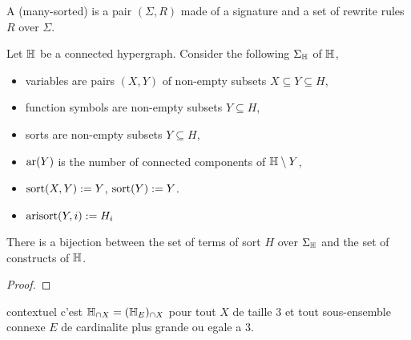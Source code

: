 \begin{definition}
  A (many-sorted)  is a pair $(\Sigma,R)$ made of a signature and a set of rewrite rules $R$ over $\Sigma$.
\end{definition}

Let ${\mathbb H}$ be a connected hypergraph. 
Consider the following  $\Sigma_{\mathbb H}$ of ${\mathbb H}$,  
\begin{itemize}
  \item variables are pairs $(X,Y)$ of non-empty subsets $X \subseteq Y \subseteq H$,
  \item function symbols are non-empty subsets $Y \subseteq H$,
  \item sorts are non-empty subsets $Y \subseteq H$,
  \item $\mathrm{ar}(Y)$ is the number of connected components of ${\mathbb H}\setminus Y$,
  \item $\operatorname{sort}(X,Y):=Y$, $\operatorname{sort}(Y):=Y$.
  \item $\operatorname{arisort}(Y,i):=H_i$
\end{itemize}

\begin{lemma}
  There is a bijection between the set of terms of sort $H$ over $\Sigma_{\mathbb H}$ and the set of constructs of ${\mathbb H}$.
\end{lemma}

\begin{proof}
  
\end{proof}

contextuel c'est ${\mathbb H}_{\cap X}=({\mathbb H}_E)_{\cap X}$ pour tout $X$ de taille $3$ et tout sous-ensemble connexe $E$ de cardinalite plus grande ou egale a $3$.




